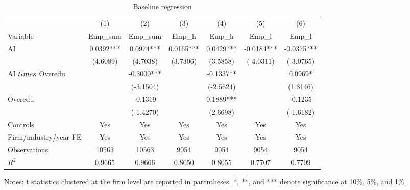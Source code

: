 \begin{table}[H]\centering\caption{Baseline regression}\label{tab:core}
\scriptsize\begin{threeparttable}
\begin{tabular}{lcccccc}\toprule
 & (1) & (2) & (3) & (4) & (5) & (6) \\
Variable & Emp\_sum & Emp\_sum & Emp\_h & Emp\_h & Emp\_l & Emp\_l \\ \midrule
AI & 0.0392*** & 0.0974*** & 0.0165*** & 0.0429*** & -0.0184*** & -0.0375*** \\
 & (4.6089) & (4.7038) & (3.7306) & (3.5858) & (-4.0311) & (-3.0765) \\
AI $\\times$ Overedu &  & -0.3000*** &  & -0.1337** &  & 0.0969* \\
 &  & (-3.1504) &  & (-2.5624) &  & (1.8146) \\
Overedu &  & -0.1319 &  & 0.1889*** &  & -0.1235 \\
 &  & (-1.4270) &  & (2.6698) &  & (-1.6182) \\
\midrule
Controls & Yes & Yes & Yes & Yes & Yes & Yes \\
Firm/industry/year FE & Yes & Yes & Yes & Yes & Yes & Yes \\
Observations & 10563 & 10563 & 9054 & 9054 & 9054 & 9054 \\
$R^2$ & 0.9665 & 0.9666 & 0.8050 & 0.8055 & 0.7707 & 0.7709 \\
\bottomrule\end{tabular}
\begin{tablenotes}\footnotesize \item Notes: t statistics clustered at the firm level are reported in parentheses. *, **, and *** denote significance at 10\%, 5\%, and 1\%.\end{tablenotes}
\end{threeparttable}\end{table}
